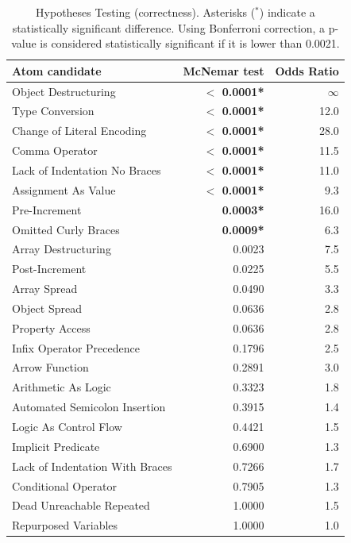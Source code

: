 \begin{table}[th!]
\caption{Hypotheses Testing (correctness). Asterisks ($^{*}$) indicate a statistically significant difference. Using Bonferroni correction, a p-value is considered statistically significant if it is lower than 0.0021.}
 \centering
 {\scriptsize 
 \begin{tabular}{lrr}
   \toprule
Atom candidate & McNemar test &      Odds Ratio \\
\midrule
Object Destructuring      &   \textbf{$<$ 0.0001*} & $\infty$ \\
Type Conversion           &   \textbf{$<$ 0.0001*} & 12.0 \\
Change of Literal Encoding   &   \textbf{$<$ 0.0001*} & 28.0 \\
Comma Operator            &   \textbf{$<$ 0.0001*} & 11.5 \\
Lack of Indentation No Braces     &   \textbf{$<$ 0.0001*} &  11.0 \\
Assignment As Value       &   \textbf{$<$ 0.0001*} &  9.3 \\
Pre-Increment              &  \textbf{0.0003*} &    16.0 \\
Omitted Curly Braces      &  \textbf{0.0009*} &  6.3 \\
Array Destructuring       &  0.0023 &     7.5 \\
Post-Increment              &  0.0225 &     5.5 \\
Array Spread              &  0.0490 &    3.3 \\
Object Spread             &  0.0636 &     2.8 \\
Property Access           &  0.0636 &     2.8 \\
Infix Operator Precedence &  0.1796 &     2.5 \\
Arrow Function            &  0.2891 &     3.0 \\
Arithmetic As Logic       &  0.3323 &  1.8 \\
Automated Semicolon Insertion  &  0.3915 &  1.4 \\
Logic As Control Flow     &  0.4421 &  1.5 \\
Implicit Predicate        &  0.6900 &  1.3 \\
Lack of Indentation With Braces   &  0.7266 &  1.7 \\
Conditional Operator      &  0.7905 &  1.3 \\
Dead Unreachable Repeated &  1.0000 &     1.5 \\
Repurposed Variables      &   1.0000 &     1.0 \\
\bottomrule
\end{tabular}
}
\label{tab:repeated:misunderstanding}
\end{table}



